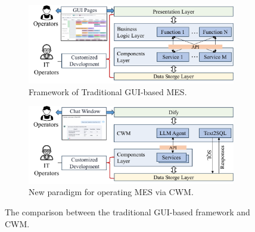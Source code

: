 \documentclass[preprint,12pt]{elsarticle}
\providecommand{\DIFaddbegin}{} %
\newcommand{\DIFaddincludegraphics}[2][]{{\color{blue}\fbox{\DIFOincludegraphics[#1]{#2}}}} %
\DeclareRobustCommand{\DIFaddbegin}{\DIFOaddbegin \let\includegraphics\DIFaddincludegraphics} %
\begin{document}
\begin{figure}[t]
    \centering
    \begin{subfigure}{\textwidth}
    \centering
    \includegraphics[width=0.8\linewidth]{figs/MES.pdf}
    \caption{Framework of Traditional GUI-based MES.}
  \end{subfigure}

  \begin{subfigure}{\textwidth}
    \centering
    \includegraphics[width=0.8\linewidth]{figs/CWM.pdf}
    \caption{New paradigm for operating MES via CWM.}
  \end{subfigure}
    \caption{The comparison between the traditional GUI-based framework and CWM.}
    \label{fig:cmp_MES_CWM}
\end{figure}
\DIFaddbegin 
\end{document}
